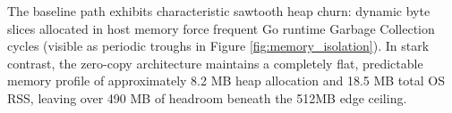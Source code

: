 The baseline path exhibits characteristic sawtooth heap churn: dynamic byte slices allocated in host memory force frequent Go runtime Garbage Collection cycles (visible as periodic troughs in Figure \ref{fig:memory_isolation}). In stark contrast, the zero-copy architecture maintains a completely flat, predictable memory profile of approximately 8.2 MB heap allocation and 18.5 MB total OS RSS, leaving over 490 MB of headroom beneath the 512MB edge ceiling.
